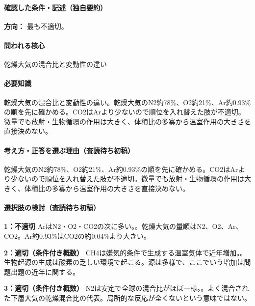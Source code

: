 \paragraph{確認した条件・記述（独自要約）}\mbox{}\par

\noindent\textbf{方向：} 最も不適切。\par

\paragraph{問われる核心} 乾燥大気の混合比と変動性の違い

\paragraph{必要知識} 乾燥大気の混合比と変動性の違い。乾燥大気のN2約78\%、O2約21\%、Ar約0.93\%の順を先に確かめる。CO2はArより少ないので順位を入れ替えた肢が不適切。微量でも放射・生物循環の作用は大きく、体積比の多寡から温室作用の大きさを直接決めない。

\paragraph{考え方・正答を選ぶ理由（査読待ち初稿）} 乾燥大気のN2約78\%、O2約21\%、Ar約0.93\%の順を先に確かめる。CO2はArより少ないので順位を入れ替えた肢が不適切。微量でも放射・生物循環の作用は大きく、体積比の多寡から温室作用の大きさを直接決めない。

\paragraph{選択肢の検討（査読待ち初稿）}\mbox{}\par

\noindent\textbf{1：不適切} ArはN2・O2・CO2の次に多い。。乾燥大気の量順はN2、O2、Ar、CO2。Ar約0.93\%はCO2の約0.04\%より大きい。\par

\noindent\textbf{2：適切（条件付き概数）} CH4は嫌気的条件で生成する温室気体で近年増加。。生物起源の生成は酸素の乏しい環境で起こる。源は多様で、ここでいう増加は問題出題の近年に関する。\par

\noindent\textbf{3：適切（条件付き概数）} N2は安定で全球の混合比がほぼ一様。。よく混合された下層大気の乾燥混合比の代表。局所的な反応が全くないという意味ではない。\par

